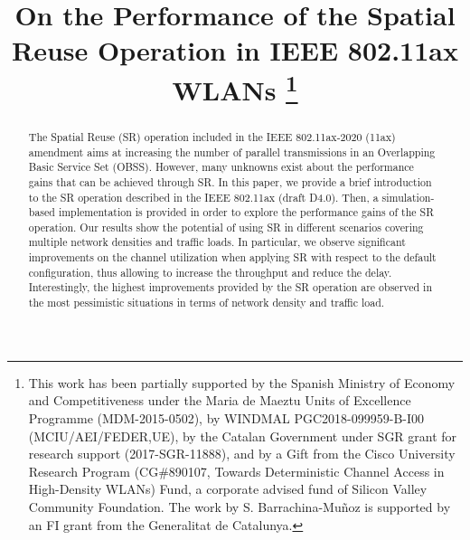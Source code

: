 \documentclass[conference]{IEEEtran}
\begin{document}
	
	\title{On the Performance of the Spatial Reuse Operation in IEEE 802.11ax WLANs
		\thanks{This  work  has  been  partially  supported  by  the Spanish Ministry of Economy and Competitiveness under the Maria de Maeztu  Units  of  Excellence  Programme (MDM-2015-0502), by WINDMAL PGC2018-099959-B-I00 (MCIU/AEI/FEDER,UE), by the Catalan Government under SGR grant for research support (2017-SGR-11888),  and  by a Gift from the Cisco University Research Program (CG\#890107, Towards Deterministic Channel Access in High-Density WLANs) Fund, a corporate advised fund of Silicon Valley Community Foundation. The work by S. Barrachina-Mu\~noz is supported by an FI grant from the Generalitat de Catalunya.}}
	
	\author{
		\and
		\and
	}
	
	\maketitle
	
	\begin{abstract}
	The Spatial Reuse (SR) operation included in the IEEE 802.11ax-2020 (11ax) amendment aims at increasing the number of parallel transmissions in an Overlapping Basic Service Set (OBSS). However, many unknowns exist about the performance gains that can be achieved through SR. In this paper, we provide a brief introduction to the SR operation described in the IEEE 802.11ax (draft D4.0). Then, a simulation-based implementation is provided in order to explore the performance gains of the SR operation. Our results show the potential of using SR in different scenarios covering multiple network densities and traffic loads. In particular, we observe significant improvements on the channel utilization when applying SR with respect to the default configuration, thus allowing to increase the throughput and reduce the delay. Interestingly, the highest improvements provided by the SR operation are observed in the most pessimistic situations in terms of network density and traffic load.
	\end{abstract}
	
\end{document}
